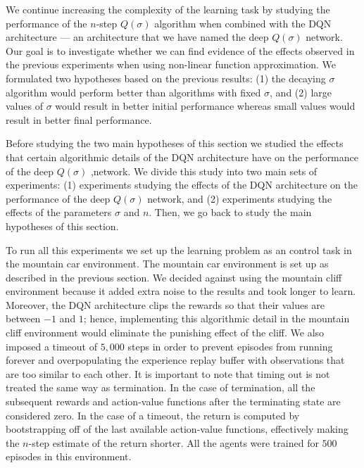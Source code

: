 We continue increasing the complexity of the learning task by studying the performance of the $n$-step $Q(\sigma)$ algorithm when combined with the DQN architecture --- an architecture that we have named the deep $Q(\sigma)$ network.
Our goal is to investigate whether we can find evidence of the effects observed in the previous experiments when using non-linear function approximation.
We formulated two hypotheses based on the previous results: (1) the decaying $\sigma$ algorithm would perform better than algorithms with fixed $\sigma$, and (2) large values of $\sigma$ would result in better initial performance whereas small values would result in better final performance.

Before studying the two main hypotheses of this section we studied the effects that certain algorithmic details of the DQN architecture have on the performance of the deep $Q(\sigma)$ ,network.
We divide this study into two main sets of experiments: (1) experiments studying the effects of the DQN architecture on the performance of the deep $Q(\sigma)$ network, and (2) experiments studying the effects of the parameters $\sigma$ and $n$.
Then, we go back to study the main hypotheses of this section.

To run all this experiments we set up the learning problem as an control task in the mountain car environment.
The mountain car environment is set up as described in the previous section.
We decided against using the mountain cliff environment because it added extra noise to the results and took longer to learn.
Moreover, the DQN architecture clips the rewards so that their values are between $-1$ and $1$; hence, implementing this algorithmic detail in the mountain cliff environment would eliminate the punishing effect of the cliff.
We also imposed a timeout of $5,000$ steps in order to prevent episodes from running forever and overpopulating the experience replay buffer with observations that are too similar to each other.
It is important to note that timing out is not treated the same way as termination.
In the case of termination, all the subsequent rewards and action-value functions after the terminating state are considered zero.
In the case of a timeout, the return is computed by bootstrapping off of the last available action-value functions, effectively making the $n$-step estimate of the return shorter.
All the agents were trained for $500$ episodes in this environment.

